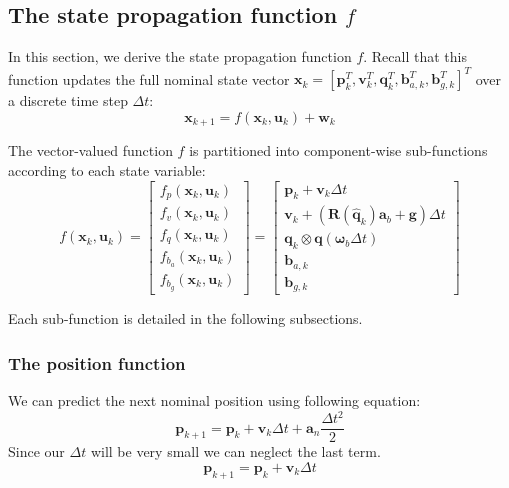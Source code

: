 \documentclass{article}
\begin{document}
	\subsection{The state propagation function $f$}
	In this section, we derive the state propagation function $f$. Recall that this function updates the full nominal state vector $\mathbf{x}_k = [\mathbf{p}_k^T, \mathbf{v}_k^T, \mathbf{q}_k^T, \mathbf{b}_{a,k}^T, \mathbf{b}_{g,k}^T]^T$ over a discrete time step $\Delta t$:
	\begin{equation}
		\mathbf{x}_{k+1} = f(\mathbf{x}_k, \mathbf{u}_k) + \mathbf{w}_k
	\end{equation}
	
	The vector-valued function $f$ is partitioned into component-wise sub-functions according to each state variable:
	\begin{equation}
		f(\mathbf{x}_k, \mathbf{u}_k) = 
		\begin{bmatrix}
			f_p(\mathbf{x}_k, \mathbf{u}_k) \\
			f_v(\mathbf{x}_k, \mathbf{u}_k) \\
			f_q(\mathbf{x}_k, \mathbf{u}_k) \\
			f_{b_a}(\mathbf{x}_k, \mathbf{u}_k) \\
			f_{b_g}(\mathbf{x}_k, \mathbf{u}_k)
		\end{bmatrix} =
		\begin{bmatrix}
			\mathbf{p}_k + \mathbf{v}_k \Delta t \\
			\mathbf{v}_k + \left( \mathbf{R}(\hat{\mathbf{q}}_k)\mathbf{a}_b + \mathbf{g} \right) \Delta t \\
			\mathbf{q}_k \otimes \mathbf{q}\left(\boldsymbol{\omega}_b \Delta t\right) \\
			\mathbf{b}_{a, k} \\
			\mathbf{b}_{g, k}
		\end{bmatrix}
	\end{equation}
	
	Each sub-function is detailed in the following subsections.
	
	\subsubsection{The position function}
	We can predict the next nominal position using following equation:
	\begin{equation}
		\mathbf{p}_{k+1} = \mathbf{p}_k + \mathbf{v}_k \Delta t + \mathbf{a}_n \frac{\Delta t^2}{2}
	\end{equation}
	Since our $\Delta t$ will be very small we can neglect the last term.
	\begin{equation}
		\mathbf{p}_{k+1} = \mathbf{p}_k + \mathbf{v}_k \Delta t
	\end{equation}
	
\end{document}
